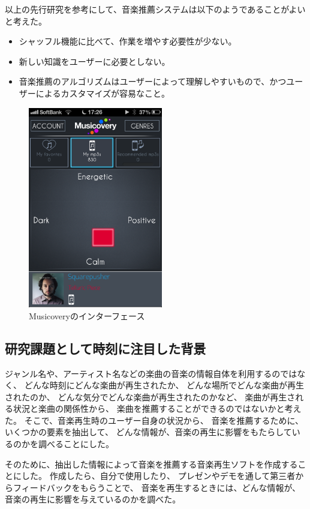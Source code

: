 \documentclass[a4paper, 11pt, onecolumn, report]{jsarticle}
\begin{document}
以上の先行研究を参考にして、音楽推薦システムは以下のようであることがよいと考えた。
\begin{itemize}
\item
シャッフル機能に比べて、作業を増やす必要性が少ない。
\item
新しい知識をユーザーに必要としない。
\item
音楽推薦のアルゴリズムはユーザーによって理解しやすいもので、かつユーザーによるカスタマイズが容易なこと。
\end{itemize}



\begin{figure}[h]
\begin{center}
\includegraphics[width=5.866cm]{musicovery.png}
\caption{Musicoveryのインターフェース}
\label{musicovery_interface}
\end{center}
\end{figure}

\subsection{研究課題として時刻に注目した背景}
ジャンル名や、アーティスト名などの楽曲の音楽の情報自体を利用するのではなく、
どんな時刻にどんな楽曲が再生されたか、
どんな場所でどんな楽曲が再生されたのか、
どんな気分でどんな楽曲が再生されたのかなど、
楽曲が再生される状況と楽曲の関係性から、
楽曲を推薦することができるのではないかと考えた。
そこで、音楽再生時のユーザー自身の状況から、
音楽を推薦するために、いくつかの要素を抽出して、
どんな情報が、音楽の再生に影響をもたらしているのかを調べることにした。

そのために、抽出した情報によって音楽を推薦する音楽再生ソフトを作成することにした。
作成したら、自分で使用したり、
プレゼンやデモを通して第三者からフィードバックをもらうことで、
音楽を再生するときには、どんな情報が、音楽の再生に影響を与えているのかを調べた。
\end{document}
